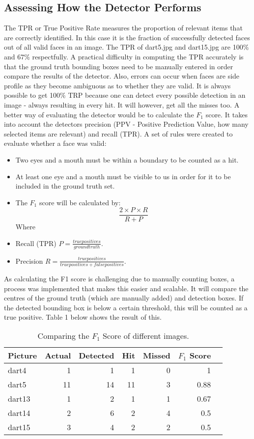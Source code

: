 \documentclass[a4paper]{article}
\begin{document}
\subsection*{Assessing How the Detector Performs}
\vspace{-0.7em}

The TPR or True Positive Rate measures the proportion of relevant items that
are correctly identified. In this case it is the fraction of successfully
detected faces out of all valid faces in an image. The TPR of dart5.jpg and
dart15.jpg are 100\% and 67\% respectfully. A practical difficulty in computing
the TPR accurately is that the ground truth bounding boxes need to be manually
entered in order compare the results of the detector. Also, errors can occur
when faces are side profile as they become ambiguous as to whether they are
valid. It is always possible to get 100\% TRP because one can detect every
possible detection in an image - always resulting in every hit. It will
however, get all the misses too. A better way of evaluating the detector would
be to calculate the \(F_{1}\) score. It takes into account the detectors
precision (PPV - Positive Prediction Value, how many selected items are
relevant) and recall (TPR). A set of rules were created to evaluate whether a
face was valid:


\begin{itemize}
  \item Two eyes and a mouth must be within a boundary to be counted as a hit.
  \item At least one eye and a mouth must be visible to us in order for it to
    be included in the ground truth set.
  \item The \(F_{1}\) score will be calculated by: \[\frac{2 \times P \times
    R}{R + P}\] Where
  \item Recall (TPR) ${P = \frac{true positives}{ground truth}}$.
  \item Precision ${R = \frac{true positives}{true positives + false
    positives}}$.
\end{itemize}

As calculating the F1 score is challenging due to manually counting boxes, a
process was implemented that makes this easier and scalable. It will compare
the centres of the ground truth (which are manually added) and detection boxes.
If the detected bounding box is below a certain threshold, this will be counted
as a true positive. Table 1 below shows the result of this.

\begin{table} [H]
\centering
\begin{tabular}{l| r | r | r | r | r | r}
Picture & Actual & Detected & Hit & Missed & \(F_{1}\) Score \\\hline
dart4 & 1 & 1 & 1 & 0 & 1\\
dart5 & 11 & 14 & 11 & 3 & 0.88 \\
dart13 & 1 & 2 & 1 & 1 & 0.67 \\
dart14 & 2 & 6 & 2 & 4 & 0.5 \\
dart15 & 3 & 4 & 2 & 2 & 0.5
\end{tabular}
\caption{\label{tab:F1}Comparing the \(F_{1}\) Score of different images.}
\end{table}
\end{document}

